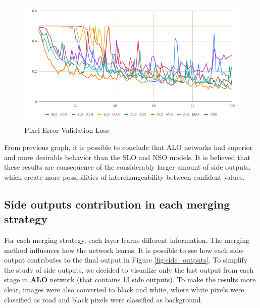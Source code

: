 \begin{figure}
  \caption{Pixel Error Validation Loss }
  \centering
    \includegraphics[width=1.\columnwidth]{figures/falreis/pixel_error.png}
  
  \label{fig:validation_accuracy_pixel_error}
\end{figure}

From previous graph, it is possible to conclude that ALO networks had superior and more desirable behavior than the SLO and NSO models. It is believed that these results are consequence of the considerably larger amount of side outputs, which create more possibilities of interchangeability between confident values.

\subsection{Side outputs contribution in each merging strategy}
\label{ssec:merging_learn}

For each merging strategy, each layer learns different information. The merging method influences how the network learns. It is possible to see how each side-output contributes to the final output in Figure \ref{fig:side_outputs}. To simplify the study of side outputs, we decided to visualize only the last  output from each stage in \textbf{ALO} network (that contains 13 side outputs).  To make the results more clear, images were also converted to black and white, where white pixels were classified as road and black pixels were classified as background.

